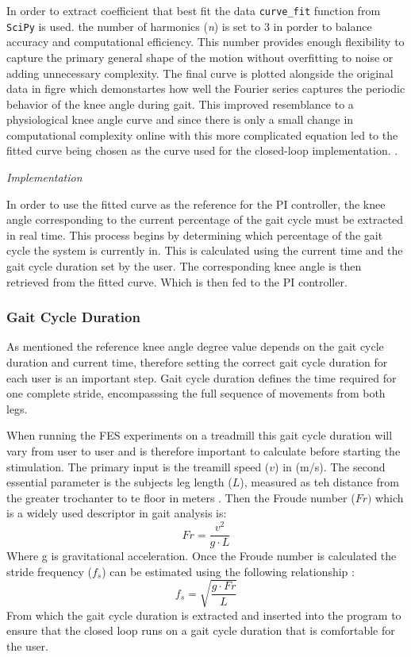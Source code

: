 In order to extract coefficient that best fit the data \texttt{curve\_fit}  function from \texttt{SciPy} is used. the number of harmonics (\textit{n}) is set to 3 in porder to balance accuracy and computational efficiency. This number provides enough flexibility to capture the primary general shape of the motion without overfitting to noise or adding unnecessary complexity. The  final curve is plotted alongside the original data in figre  which demonstartes how well the Fourier series captures the periodic behavior of the knee angle during gait. This improved resemblance to a physiological knee angle curve and since there is only a small change in computational complexity online with this more complicated equation led to the fitted curve being chosen as the curve used for the closed-loop implementation.
.
\newline

\textit{Implementation}

In order to use the fitted curve as the reference for the PI controller, the knee angle corresponding to the current percentage of the gait cycle must be extracted in real time. This process begins by determining which percentage of the gait cycle the system is currently in. This is calculated using the current time and the gait cycle duration set by the user. The corresponding knee angle is then retrieved from the fitted curve. Which is then fed to the PI controller.

\subsubsection{Gait Cycle Duration}
As mentioned the reference knee angle degree value depends on the gait cycle duration and current time, therefore setting the correct gait cycle duration for each user is an important step. Gait cycle duration defines the time required for one complete stride, encompasssing the full sequence of movements from both legs. 

When running the FES experiments on a treadmill this gait cycle duration will vary from user to user and is therefore important to calculate before starting the stimulation. The primary input is the treamill speed (\(v\)) in (m/s). The second essential parameter is the subjects leg length (\(L\)), measured as teh distance from the greater trochanter to te floor in meters . Then the Froude number (\(Fr)\) which is a widely used descriptor in gait analysis is:
\begin{equation}
    Fr = \frac{v^2}{g \cdot L}
\end{equation}
Where g is gravitational acceleration. Once the Froude number is calculated the stride frequency (\(f_s\)) can be estimated using the following relationship :
\begin{equation}
    f_s = \sqrt{\frac{g \cdot Fr}{L}}
\end{equation}
From which the gait cycle duration is extracted and inserted into the program to ensure that the closed loop runs on a gait cycle duration that is comfortable for the user.


